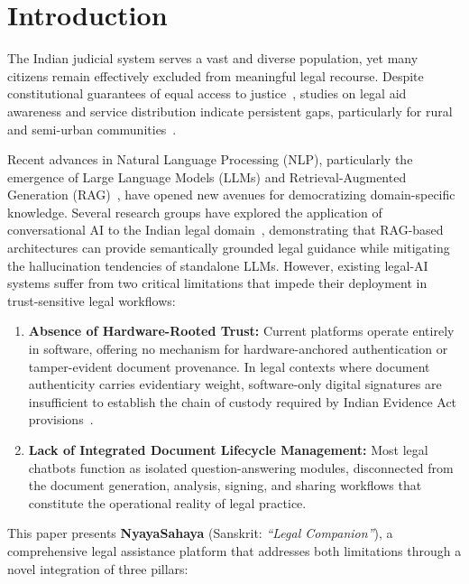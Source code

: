 \section{Introduction}
\label{sec:introduction}

The Indian judicial system serves a vast and diverse population, yet many citizens remain effectively excluded from meaningful legal recourse. Despite constitutional guarantees of equal access to justice~\cite{constitution_india}, studies on legal aid awareness and service distribution indicate persistent gaps, particularly for rural and semi-urban communities~\cite{nalsa2024report, bar_council_stats}.

Recent advances in Natural Language Processing (NLP), particularly the emergence of Large Language Models (LLMs) and Retrieval-Augmented Generation (RAG)~\cite{lewis2020rag}, have opened new avenues for democratizing domain-specific knowledge. Several research groups have explored the application of conversational AI to the Indian legal domain~\cite{panchal2025lawpal, bharatlex2025}, demonstrating that RAG-based architectures can provide semantically grounded legal guidance while mitigating the hallucination tendencies of standalone LLMs. However, existing legal-AI systems suffer from two critical limitations that impede their deployment in trust-sensitive legal workflows:

\begin{enumerate}
    \item \textbf{Absence of Hardware-Rooted Trust:} Current platforms operate entirely in software, offering no mechanism for hardware-anchored authentication or tamper-evident document provenance. In legal contexts where document authenticity carries evidentiary weight, software-only digital signatures are insufficient to establish the chain of custody required by Indian Evidence Act provisions~\cite{it_act_2000}.
    \item \textbf{Lack of Integrated Document Lifecycle Management:} Most legal chatbots function as isolated question-answering modules, disconnected from the document generation, analysis, signing, and sharing workflows that constitute the operational reality of legal practice.
\end{enumerate}

This paper presents \textbf{NyayaSahaya} (Sanskrit: \textit{``Legal Companion''}), a comprehensive legal assistance platform that addresses both limitations through a novel integration of three pillars:

